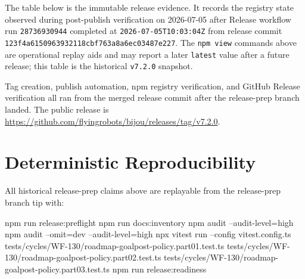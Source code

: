 The table below is the immutable release evidence. It records the registry state observed during post-publish verification on 2026-07-05 after Release workflow run \texttt{2\allowbreak{}8\allowbreak{}7\allowbreak{}3\allowbreak{}6\allowbreak{}9\allowbreak{}3\allowbreak{}0\allowbreak{}9\allowbreak{}4\allowbreak{}4} completed at \texttt{2\allowbreak{}0\allowbreak{}2\allowbreak{}6\allowbreak{}-\allowbreak{}0\allowbreak{}7\allowbreak{}-\allowbreak{}0\allowbreak{}5\allowbreak{}T\allowbreak{}1\allowbreak{}0\allowbreak{}:\allowbreak{}0\allowbreak{}3\allowbreak{}:\allowbreak{}0\allowbreak{}4\allowbreak{}Z} from release commit \texttt{1\allowbreak{}2\allowbreak{}3\allowbreak{}f\allowbreak{}4\allowbreak{}a\allowbreak{}6\allowbreak{}1\allowbreak{}5\allowbreak{}0\allowbreak{}9\allowbreak{}6\allowbreak{}3\allowbreak{}9\allowbreak{}3\allowbreak{}2\allowbreak{}1\allowbreak{}1\allowbreak{}8\allowbreak{}c\allowbreak{}b\allowbreak{}f\allowbreak{}7\allowbreak{}6\allowbreak{}3\allowbreak{}a\allowbreak{}8\allowbreak{}a\allowbreak{}6\allowbreak{}e\allowbreak{}c\allowbreak{}0\allowbreak{}3\allowbreak{}4\allowbreak{}8\allowbreak{}7\allowbreak{}e\allowbreak{}2\allowbreak{}2\allowbreak{}7}. The \texttt{n\allowbreak{}p\allowbreak{}m\allowbreak{} \allowbreak{}v\allowbreak{}i\allowbreak{}e\allowbreak{}w} commands above are operational replay aids and may report a later \texttt{l\allowbreak{}a\allowbreak{}t\allowbreak{}e\allowbreak{}s\allowbreak{}t} value after a future release; this table is the historical \texttt{v\allowbreak{}7\allowbreak{}.\allowbreak{}2\allowbreak{}.\allowbreak{}0} snapshot.



Tag creation, publish automation, npm registry verification, and GitHub Release verification all ran from the merged release commit after the release-prep branch landed. The public release is \url{https://github.com/flyingrobots/bijou/releases/tag/v7.2.0}.

\section{Deterministic Reproducibility}\label{record-261-deterministic-reproducibility}

All historical release-prep claims above are replayable from the release-prep branch tip with:

\begin{CodeBlock}
npm run release:preflight
npm run docs:inventory
npm audit --audit-level=high
npm audit --omit=dev --audit-level=high
npx vitest run --config vitest.config.ts tests/cycles/WF-130/roadmap-goalpost-policy.part01.test.ts tests/cycles/WF-130/roadmap-goalpost-policy.part02.test.ts tests/cycles/WF-130/roadmap-goalpost-policy.part03.test.ts
npm run release:readiness
\end{CodeBlock}

